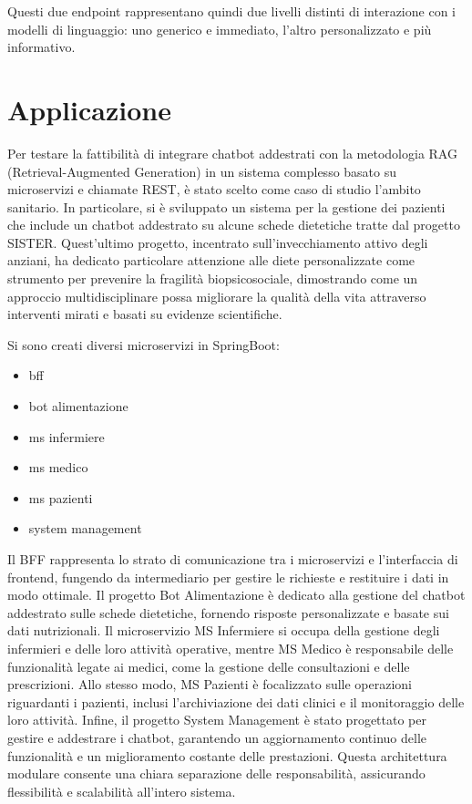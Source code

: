 \documentclass[a4paper,twoside,12pt]{toptesi}
\begin{document}
Questi due endpoint rappresentano quindi due livelli distinti di interazione con i modelli di linguaggio: uno generico e immediato, l'altro personalizzato e più informativo.

\chapter{Applicazione}

Per testare la fattibilità di integrare chatbot addestrati con la metodologia RAG (Retrieval-Augmented Generation) in un sistema complesso basato su microservizi e chiamate REST, è stato scelto come caso di studio l'ambito sanitario. In particolare, si è sviluppato un sistema per la gestione dei pazienti che include un chatbot addestrato su alcune schede dietetiche tratte dal progetto SISTER. Quest'ultimo progetto, incentrato sull'invecchiamento attivo degli anziani, ha dedicato particolare attenzione alle diete personalizzate come strumento per prevenire la fragilità biopsicosociale, dimostrando come un approccio multidisciplinare possa migliorare la qualità della vita attraverso interventi mirati e basati su evidenze scientifiche.


Si sono creati diversi microservizi in SpringBoot:
\begin{itemize}
\item bff
\item bot alimentazione
\item ms infermiere
\item ms medico
\item ms pazienti
\item system management
\end{itemize}

Il BFF rappresenta lo strato di comunicazione tra i microservizi e l'interfaccia di frontend, fungendo da intermediario per gestire le richieste e restituire i dati in modo ottimale. Il progetto Bot Alimentazione è dedicato alla gestione del chatbot addestrato sulle schede dietetiche, fornendo risposte personalizzate e basate sui dati nutrizionali. Il microservizio MS Infermiere si occupa della gestione degli infermieri e delle loro attività operative, mentre MS Medico è responsabile delle funzionalità legate ai medici, come la gestione delle consultazioni e delle prescrizioni. Allo stesso modo, MS Pazienti è focalizzato sulle operazioni riguardanti i pazienti, inclusi l'archiviazione dei dati clinici e il monitoraggio delle loro attività. Infine, il progetto System Management è stato progettato per gestire e addestrare i chatbot, garantendo un aggiornamento continuo delle funzionalità e un miglioramento costante delle prestazioni. Questa architettura modulare consente una chiara separazione delle responsabilità, assicurando flessibilità e scalabilità all’intero sistema.
\end{document}
